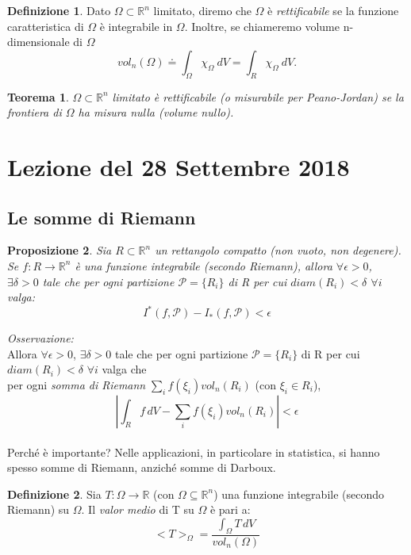 \documentclass[10pt]{article}
\theoremstyle{plain}
\newtheorem{thm}{Teorema}[section]
\newtheorem{prop}[thm]{Proposizione}
\theoremstyle{definition}
\newtheorem{defn}{Definizione}
\begin{document}
\begin{defn}
Dato $\Omega \subset \mathbb{R}^n$ limitato, diremo che $\Omega$ è \textit{rettificabile} se la funzione caratteristica di $\Omega$ è integrabile in $\Omega$.
Inoltre, se chiameremo volume n-dimensionale di $\Omega$
$$vol_n(\Omega) \doteq \int_\Omega \chi_\Omega \ dV = \int_R \chi_\Omega \ dV.$$
\end{defn}

\begin{thm}
$\Omega \subset \mathbb{R}^n$ limitato è rettificabile (\textit{o misurabile per Peano-Jordan}) se la frontiera di $\Omega$ ha misura nulla (\textit{volume nullo}).
\end{thm}

\section{Lezione del 28 Settembre 2018}

\subsection{Le somme di Riemann}
\begin{prop}
Sia $R \subset \mathbb{R}^n$ un rettangolo compatto (non vuoto, non degenere). Se $f:R \to \mathbb{R}^n$ è una funzione integrabile (secondo Riemann), allora $\forall \epsilon >0$, $\exists \delta >0$ tale che per ogni partizione $\mathcal{P} = \{ R_i \}$ di R per cui $diam(R_i) < \delta$ $\forall i$ valga: 
$$I^{*}(f,\mathcal{P}) - I_{*}(f,\mathcal{P}) < \epsilon$$
\end{prop}

\textit{Osservazione:}\\
Allora $\forall \epsilon >0$, $\exists \delta >0$ tale che per ogni partizione $\mathcal{P} = \{ R_i \}$ di R per cui $diam(R_i) < \delta$ $\forall i$ valga che\\
per ogni \textit{somma di Riemann} $\sum_i f(\xi_i) vol_n(R_i)$ (con $\xi_i \in R_i$),
$$\left | \int_R f\,dV - \sum_i f(\xi_i)vol_n(R_i)\right |< \epsilon$$
\\
Perché è importante?
Nelle applicazioni, in particolare in statistica, si hanno spesso somme di Riemann, anziché somme di Darboux.
\begin{defn}
Sia $T: \Omega \to \mathbb{R}$ (con $\Omega \subseteq \mathbb{R}^n$) una funzione integrabile (secondo Riemann) su $\Omega$.
Il \textit{valor medio} di T su $\Omega$ è pari a:
$$<T>_{\Omega} = \frac{\int_{\Omega} T \,dV}{vol_n(\Omega)}$$
\end{defn}
\end{document}
